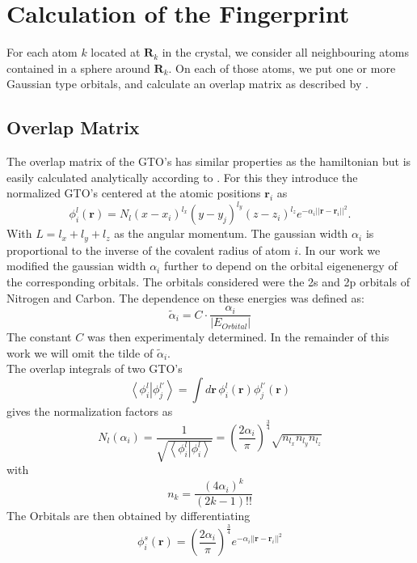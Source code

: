 \section{Calculation of the Fingerprint}
For each atom $k$ located at $\mathbf{R}_k$ in the crystal, we consider all neighbouring atoms contained in a sphere around $\mathbf{R}_k$. On each of those atoms, we put one or more Gaussian type orbitals, and calculate an overlap matrix as described by \citeauthor{Sadeghi2013} \cite{Sadeghi2013}.
\subsection{Overlap Matrix}
The overlap matrix of the GTO's has similar properties as the hamiltonian but is easily calculated analytically according to \citeauthor{Sadeghi2013} \cite{Sadeghi2013}. For this they introduce the normalized GTO's centered at the atomic positions $\mathbf{r}_i$ as
\begin{equation}\phi_i^l(\mathbf{r})=N_l(x-x_i)^{l_x}(y-y_j)^{l_y}(z-z_i)^{l_z}e^{-\alpha_i||\mathbf{r}-\mathbf{r}_i||^2}.\end{equation}
With $L=l_x+l_y+l_z$ as the angular momentum. The gaussian width $\alpha_i$ is proportional to the inverse of the covalent radius of atom $i$. In our work we modified the gaussian width $\alpha_i$ further to depend on the orbital eigenenergy of the corresponding orbitals. The orbitals considered were the 2s and 2p orbitals of Nitrogen and Carbon. The dependence on these energies was defined as:
\begin{equation}\label{eq:const}\tilde{\alpha}_i=C\cdot\frac{\alpha_i}{\left|E_{Orbital}\right|}\end{equation} 
The constant $C$ was then experimentaly determined. In the remainder of this work we will omit the tilde of $\tilde{\alpha}_i$.\\
The overlap integrals of two GTO's 
\begin{equation}\left<\phi_i^l\right|\left.\phi_j^{l'}\right>=\int d\mathbf{r}\,\phi_i^l(\mathbf{r})\phi^{l'}_j(\mathbf{r})\end{equation}
gives the normalization factors as
\begin{equation}N_l(\alpha_i)=\frac{1}{\sqrt{\left<\phi_i^l\right|\left.\phi_i^l\right>}}=\left(\frac{2\alpha_i}{\pi}\right)^{\frac{3}{4}}\sqrt{n_{l_x}n_{l_y}n_{l_z}}\end{equation}
with
$$n_k=\frac{(4\alpha_i)^k}{(2k-1)!!}$$
The Orbitals are then obtained by differentiating
$$\phi_i^s(\mathbf{r})=\left(\frac{2\alpha_i}{\pi}\right)^{\frac{3}{4}}e^{-\alpha_i||\mathbf{r}-\mathbf{r}_i||^2}$$
